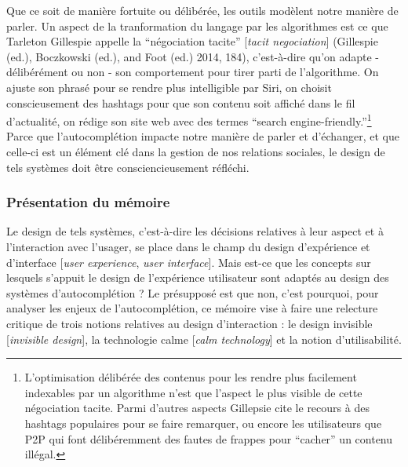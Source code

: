 \documentclass[]{article}
\begin{document}
Que ce soit de manière fortuite ou délibérée, les outils modèlent notre
manière de parler. Un aspect de la tranformation du langage par les
algorithmes est ce que Tarleton Gillespie appelle la ``négociation
tacite'' {[}\emph{tacit negociation}{]} (Gillespie (ed.), Boczkowski
(ed.), and Foot (ed.) 2014, 184), c'est-à-dire qu'on adapte -
délibérément ou non - son comportement pour tirer parti de l'algorithme.
On ajuste son phrasé pour se rendre plus intelligible par Siri, on
choisit conscieusement des hashtags pour que son contenu soit affiché
dans le fil d'actualité, on rédige son site web avec des termes ``search
engine-friendly.''\footnote{L'optimisation délibérée des contenus pour
  les rendre plus facilement indexables par un algorithme n'est que
  l'aspect le plus visible de cette négociation tacite. Parmi d'autres
  aspects Gillepsie cite le recours à des hashtags populaires pour se
  faire remarquer, ou encore les utilisateurs que P2P qui font
  délibéremment des fautes de frappes pour ``cacher'' un contenu
  illégal.}\\
Parce que l'autocomplétion impacte notre manière de parler et
d'échanger, et que celle-ci est un élément clé dans la gestion de nos
relations sociales, le design de tels systèmes doit être
consciencieusement réfléchi.

\hypertarget{pruxe9sentation-du-muxe9moire}{%
\subsubsection{Présentation du
mémoire}\label{pruxe9sentation-du-muxe9moire}}

Le design de tels systèmes, c'est-à-dire les décisions relatives à leur
aspect et à l'interaction avec l'usager, se place dans le champ du
design d'expérience et d'interface {[}\emph{user experience}, \emph{user
interface}{]}. Mais est-ce que les concepts sur lesquels s'appuit le
design de l'expérience utilisateur sont adaptés au design des systèmes
d'autocomplétion ? Le présupposé est que non, c'est pourquoi, pour
analyser les enjeux de l'autocomplétion, ce mémoire vise à faire une
relecture critique de trois notions relatives au design d'interaction :
le design invisible {[}\emph{invisible design}{]}, la technologie calme
{[}\emph{calm technology}{]} et la notion d'utilisabilité.
\end{document}
